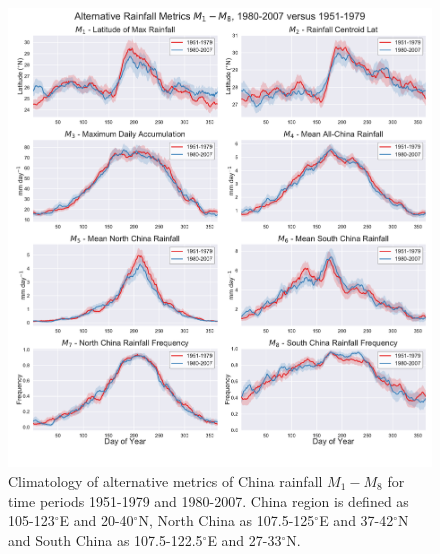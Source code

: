 \documentclass[singlecolumn,11pt]{pnas-new}
\begin{document}
\begin{figure}[htb]
\centering
\includegraphics[width=36pc]{Figures/alternative_metrics_8007_5179}
\caption{Climatology of alternative metrics of China rainfall $M_1-M_8$ for time periods 1951-1979 and 1980-2007. China region is defined as 105-123$^{\circ}$E and 20-40$^{\circ}$N, North China as 107.5-125$^{\circ}$E and 37-42$^{\circ}$N and South China as 107.5-122.5$^{\circ}$E and 27-33$^{\circ}$N.}
\label{fig:alternative_metrics}
\end{figure}
\end{document}
